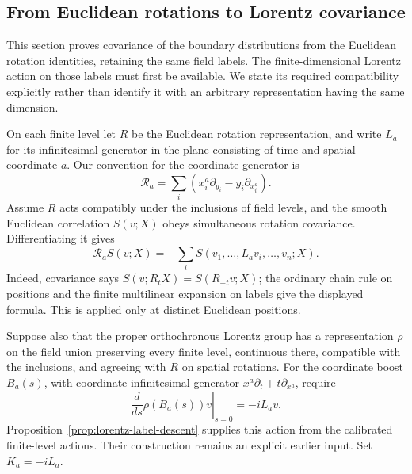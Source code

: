 \subsection{From Euclidean rotations to Lorentz covariance}
\label{sec:lorentz-covariance}
This section proves covariance of the boundary distributions from the
Euclidean rotation identities, retaining the same field labels. The
finite-dimensional Lorentz action on those labels must first be available.
We state its required compatibility explicitly rather than identify it with
an arbitrary representation having the same dimension.

On each finite level let $R$ be the Euclidean rotation representation, and
write $L_a$ for its infinitesimal generator in the plane consisting of time
and spatial coordinate $a$. Our convention for the coordinate generator is
\[
 \mathcal R_a=\sum_i\left(x_i^a\partial_{y_i}
                                  -y_i\partial_{x_i^a}\right).
\]
Assume $R$ acts compatibly under the inclusions of field levels, and the
smooth Euclidean correlation $S(v;X)$ obeys simultaneous rotation covariance.
Differentiating it gives
\begin{equation}\label{eq:euclid-infinitesimal}
 \mathcal R_aS(v;X)=-\sum_i S(v_1,\ldots,L_av_i,\ldots,v_n;X).
\end{equation}
Indeed, covariance says $S(v;R_tX)=S(R_{-t}v;X)$; the ordinary chain rule on
positions and the finite multilinear expansion on labels give the displayed
formula. This is applied only at distinct Euclidean positions.

Suppose also that the proper orthochronous Lorentz group has a representation
$\rho$ on the field union preserving every finite level, continuous there,
compatible with the inclusions, and agreeing with $R$ on spatial rotations.
For the coordinate boost $B_a(s)$, with coordinate infinitesimal generator
$x^a\partial_t+t\partial_{x^a}$, require
\begin{equation}\label{eq:label-boost-input}
 \left.\frac{d}{ds}\rho(B_a(s))v\right|_{s=0}=-iL_av.
\end{equation}
Proposition~\ref{prop:lorentz-label-descent} supplies this action from the
calibrated finite-level actions. Their construction remains an explicit
earlier input. Set $K_a=-iL_a$.

